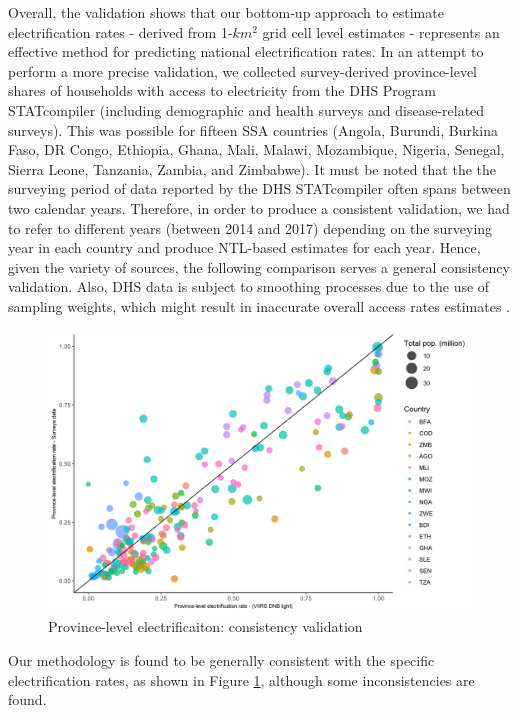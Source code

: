 \documentclass[preprint,12pt]{elsarticle}
\begin{document}
Overall, the validation shows that our bottom-up approach to estimate electrification rates - derived from 1-$km^2$ grid cell level estimates - represents an effective method for predicting national electrification rates. In an attempt to perform a more precise validation, we collected survey-derived province-level shares of households with access to electricity from the DHS Program STATcompiler (including demographic and health surveys and disease-related surveys). This was possible for fifteen SSA countries (Angola, Burundi, Burkina Faso, DR Congo, Ethiopia, Ghana, Mali, Malawi, Mozambique, Nigeria, Senegal, Sierra Leone, Tanzania, Zambia, and Zimbabwe). It must be noted that the the surveying period of data reported by the DHS STATcompiler often spans between two calendar years. Therefore, in order to produce a consistent validation, we had to refer to different years (between 2014 and 2017) depending on the surveying year in each country and produce NTL-based estimates for each year. Hence, given the variety of sources, the following comparison serves a general consistency validation. Also, DHS data is subject to smoothing processes due to the use of sampling weights, which might result in inaccurate overall access rates estimates \citep{macro2009measure}. 

\begin{figure}[H]
    \centering
    \includegraphics[scale=0.7]{figures/comparisontanzaniazoom.png}
    \caption{Province-level electrificaiton: consistency validation}
    \label{TanzaniaNigeriaGhana}
\end{figure}

Our methodology is found to be generally consistent with the specific electrification rates, as shown in Figure \ref{TanzaniaNigeriaGhana}, although some inconsistencies are found.
\end{document}
